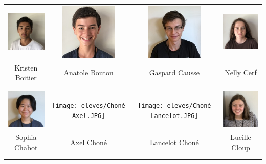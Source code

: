 \begin{center}
\begin{tabular}{cccc}
\includegraphics[angle=270,origin=c, width=27mm]{eleves/Boitier Kristen.JPG} &
\includegraphics[angle=270,origin=c, width=27mm]{eleves/Bouton Anatole.JPG} &
\includegraphics[angle=270,origin=c, width=27mm]{eleves/Causse Gaspard.JPG} &
\includegraphics[angle=270,origin=c, width=27mm]{eleves/Cerf Nelly.JPG} \\
Kristen Boitier & Anatole Bouton & Gaspard Causse & Nelly Cerf \\ \\ \\ 

\includegraphics[angle=270,origin=c, width=27mm]{eleves/Chabot Sophia.JPG} &
\texttt{[image: eleves/Choné Axel.JPG]} &
\texttt{[image: eleves/Choné Lancelot.JPG]} &
\includegraphics[angle=270,origin=c, width=27mm]{eleves/Cloup Lucille.JPG} \\
Sophia Chabot & Axel Choné & Lancelot Choné & Lucille Cloup \\ \\ \\ 


\end{tabular}
\end{center}
